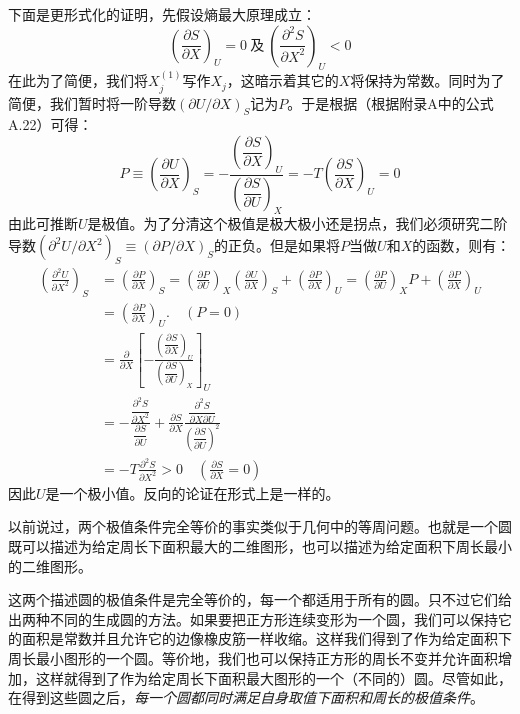 下面是更形式化的证明，先假设熵最大原理成立：
\begin{equation}
\label{equ5.1}
\left(\frac{\partial S}{\partial X}\right)_U=0
~\text{及}~
\left(\frac{\partial^2 S}{\partial X^2}\right)_U<0
\end{equation}
在此为了简便，我们将$X_j^{(1)}$写作$X_j$，这暗示着其它的$X$将保持为常数。同时为了简便，我们暂时将一阶导数$(\partial U/\partial X)_S$记为$P$。于是根据（根据附录A中的公式A.22）可得：
\begin{equation}
\label{equ5.2}
	P \equiv \left( \frac{\partial U}{\partial X} \right)_S = -\frac{ \left( \dfrac{\partial S}{\partial X} \right)_U }{ \left( \dfrac{\partial S}{\partial U}\right)_X } = -T \left(\frac{\partial S}{\partial X}\right)_U = 0
\end{equation}
由此可推断$U$是极值。为了分清这个极值是极大极小还是拐点，我们必须研究二阶导数$(\partial^2U/\partial X^2)_S\equiv(\partial P/\partial X)_S$的正负。但是如果将$P$当做$U$和$X$的函数，则有：
\begin{align}
	\left(\frac{\partial^2 U}{\partial X^2}\right)_S &=\left(\frac{\partial P}{\partial X}\right)_S =\left(\frac{\partial P}{\partial U}\right)_X \left(\frac{\partial U}{\partial X}\right)_S +\left(\frac{\partial P}{\partial X}\right)_U =\left(\frac{\partial P}{\partial U}\right)_XP +\left(\frac{\partial P}{\partial X}\right)_U \label{equ5.3} \\
	&= \left( \frac{\partial P}{\partial X} \right)_U. \quad (P=0) \label{equ5.4} \\
	&= \frac{\partial}{\partial X} \left[- \frac{ \left( \dfrac{\partial S}{\partial X} \right)_U }{ \left( \dfrac{\partial S}{\partial U}\right)_X } \right]_U \label{equ5.5} \\
	&= -\frac{\dfrac{\partial^2 S}{\partial X^2}} {\dfrac{\partial S}{\partial U}} + \frac{\partial S}{\partial X} \frac{\dfrac{\partial^2 S}{\partial X \partial U}}{\left(\dfrac{\partial S}{\partial U}\right)^2} \label{equ5.6} \\
	&= -T\frac{\partial^2 S}{\partial X^2}>0 \quad \left( \frac{\partial S}{\partial X}=0 \right) \label{equ5.7}
\end{align}
因此$U$是一个极小值。反向的论证在形式上是一样的。

以前说过，两个极值条件完全等价的事实类似于几何中的等周问题。也就是一个圆既可以描述为给定周长下面积最大的二维图形，也可以描述为给定面积下周长最小的二维图形。

这两个描述圆的极值条件是完全等价的，每一个都适用于所有的圆。只不过它们给出两种不同的生成圆的方法。如果要把正方形连续变形为一个圆，我们可以保持它的面积是常数并且允许它的边像橡皮筋一样收缩。这样我们得到了作为给定面积下周长最小图形的一个圆。等价地，我们也可以保持正方形的周长不变并允许面积增加，这样就得到了作为给定周长下面积最大图形的一个（不同的）圆。尽管如此，在得到这些圆之后，{\it 每一个圆都同时满足自身取值下面积和周长的极值条件}。

